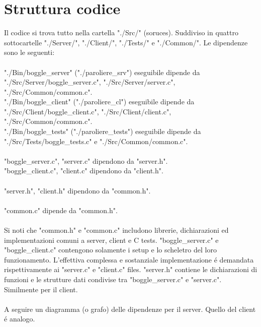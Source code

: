 \chapter{Struttura codice}

Il codice si trova tutto nella cartella "./Src/" (soruces). Suddiviso in quattro sottocartelle "./Server/", "./Client/", "./Tests/" e "./Common/". Le dipendenze sono le seguenti:
\\
\\
"./Bin/boggle\_server" ("./paroliere\_srv") eseguibile dipende da "./Src/Server/boggle\_server.c", "./Src/Server/server.c", "./Src/Common/common.c".
\\
"./Bin/boggle\_client" ("./paroliere\_cl") eseguibile dipende da "./Src/Client/boggle\_client.c", "./Src/Client/client.c", "./Src/Common/common.c".
\\
"./Bin/boggle\_tests" ("./paroliere\_tests") eseguibile dipende da "./Src/Tests/boggle\_tests.c" e "./Src/Common/common.c".
\\
\\
"boggle\_server.c", "server.c" dipendono da "server.h".
\\
"boggle\_client.c", "client.c" dipendono da "client.h".
\\
\\
"server.h", "client.h" dipendono da "common.h".
\\
\\
"common.c" dipende da "common.h".
\\
\\
Si noti che "common.h" e "common.c" includono librerie, dichiarazioni ed implementazioni comuni a server, client e C tests. "boggle\_server.c" e "boggle\_client.c" contengono solamente i setup e lo scheletro del loro funzionamento. L'effettiva complessa e sostanziale implementazione \'e demandata rispettivamente ai "server.c" e "client.c" files. "server.h" contiene le dichiarazioni di funzioni e le strutture dati condivise tra "boggle\_server.c" e "server.c". Similmente per il client.
\\
\\
A seguire un diagramma (o grafo) delle dipendenze per il server. Quello del client \'e analogo.


\usetikzlibrary{shapes,arrows,positioning}

